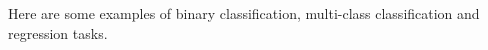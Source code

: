 \documentclass{article}
\begin{document}

Here are some examples of binary classification, multi-class classification and regression tasks.




\end{document}
